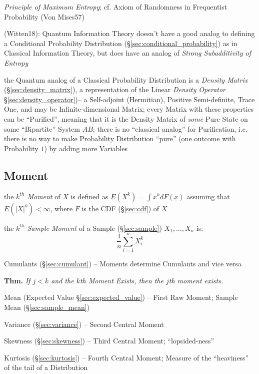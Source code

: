 \emph{Principle of Maximum Entropy}; cf. Axiom of Randomness in Frequentist
Probability (Von Mises57)

(Witten18): Quantum Information Theory doesn't have a good analog to defining a
Conditional Probability Distribution (\S\ref{sec:conditional_probability}) as in
Classical Information Theory, but does have an analog of \emph{Strong
  Subadditivity of Entropy}

the Quantum analog of a Classical Probability Distribution is a \emph{Density
  Matrix} (\S\ref{sec:density_matrix}), a representation of the Linear
\emph{Density Operator} \S\ref{sec:density_operator})-- a Self-adjoint
(Hermitian), Positive Semi-definite, Trace One, and may be Infinite-dimensional
Matrix; every Matrix with these properties can be ``Purified'', meaning that it
is the Density Matrix of \emph{some} Pure State on some ``Bipartite'' System
$AB$; there is no ``classical analog'' for Purification, i.e. there is no way to
make Probability Distribution ``pure'' (one outcome with Probability $1$) by
adding more Variables



\subsection{Moment}\label{sec:moment}

the \emph{$k^{th}$ Moment} of $X$ is defined as $E(X^k) = \int x^k dF(x)$
assuming that $E(|X|^k) < \infty$, where $F$ is the CDF (\S\ref{sec:cdf}) of $X$

the \emph{$k^{th}$ Sample Moment} of a Sample (\S\ref{sec:sample}) $X_1, \ldots,
X_n$ is:
\[
  \frac{1}{n}\sum_{i=1}^n X^k_{i}
\]

\fist Cumulants (\S\ref{sec:cumulant}) -- Moments determine Cumulants and vice
versa

\textbf{Thm.} \emph{If $j < k$ and the $k$th Moment Exists, then the $j$th
  moment exists.}

Mean (Expected Value \S\ref{sec:expected_value}) -- First Raw Moment; Sample
Mean (\S\ref{sec:sample_mean})

Variance (\S\ref{sec:variance}) -- Second Central Moment

Skewness (\S\ref{sec:skewness}) -- Third Central Moment; ``lopsided-ness''

Kurtosis (\S\ref{sec:kurtosis}) -- Fourth Central Moment; Measure of the
``heaviness'' of the tail of a Distribution

